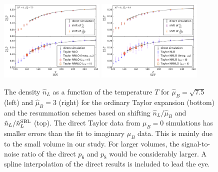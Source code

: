 \documentclass[twocolumn,showpacs,preprintnumbers,amsmath,amssymb,latexsym,prl,footinbib,floatfix,superscriptaddress]{revtex4-2}
\begin{document}
\begin{figure}[t]
    \centering
    \includegraphics[width=0.45\textwidth]{method_comp2_mu27.5.pdf}
    \includegraphics[width=0.45\textwidth]{method_comp2_mu29.0.pdf}
    \caption{
        \vspace{-0.02cm}
        The density $\hat{n}_L$ as a function of the temperature $T$ for $\hat{\mu}_B = \sqrt{7.5} $ (left) and $\hat{\mu}_B = 3 $ (right) for the ordinary Taylor 
        expansion (bottom) and the resummation schemes based on shifting $\hat{n}_L/\hat{\mu}_B$ and $\hat{n}_L/\hat{n}_L^{\rm{SBL}}$ (top).
        The direct Taylor data from $\mu_B=0$ simulations has smaller errors than 
        the fit to imaginary $\mu_B$ data. This is mainly due to the small 
        volume in our study. For larger volumes, the signal-to-noise ratio of the 
        direct $p_6$ and $p_8$ would be considerably larger. A spline interpolation of the 
        direct results is included to lead the eye.
        \vspace{-0.5cm}
        \label{fig:Tscan}
    }
\end{figure}
\end{document}
